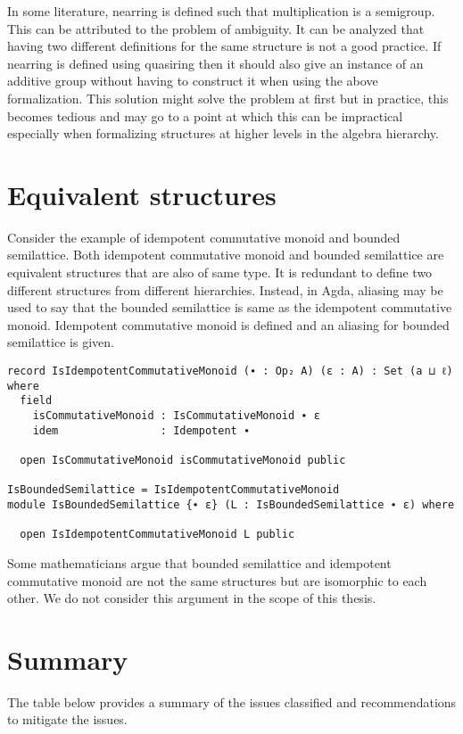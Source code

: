 In some literature, nearring is defined such that multiplication is a semigroup.
This can be attributed to the problem of ambiguity. It can be analyzed that
having two different definitions for the same structure is not a good practice.
If nearring is defined using quasiring then it should also give an instance of
an additive group without having to construct it when using the above
formalization. This solution might solve the problem at first but in practice,
this becomes tedious and may go to a point at which this can be impractical
especially when formalizing structures at higher levels in the algebra
hierarchy.

\section{Equivalent structures}
Consider the example of idempotent commutative monoid and bounded semilattice.
Both idempotent commutative monoid and bounded semilattice are equivalent
structures that are also of same type. It is redundant to define two different
structures from different hierarchies. Instead, in Agda, aliasing may be used to
say that the bounded semilattice is same as the idempotent commutative monoid.
Idempotent commutative monoid is defined and an aliasing for bounded semilattice
is given.

\begin{verbatim}
record IsIdempotentCommutativeMonoid (∙ : Op₂ A) (ε : A) : Set (a ⊔ ℓ) where
  field
    isCommutativeMonoid : IsCommutativeMonoid ∙ ε
    idem                : Idempotent ∙

  open IsCommutativeMonoid isCommutativeMonoid public

IsBoundedSemilattice = IsIdempotentCommutativeMonoid
module IsBoundedSemilattice {∙ ε} (L : IsBoundedSemilattice ∙ ε) where

  open IsIdempotentCommutativeMonoid L public
\end{verbatim}

Some mathematicians argue that bounded semilattice and idempotent
commutative monoid are not the same structures but are isomorphic to each other.
We do not consider this argument in the scope of this thesis.

\section{Summary}
The table below provides a summary of the issues classified and recommendations
to mitigate the issues.

